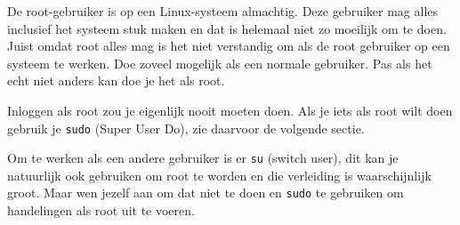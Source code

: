 De root-gebruiker is op een Linux-systeem almachtig. Deze gebruiker mag alles inclusief het systeem stuk maken en dat is helemaal niet zo moeilijk om te doen. Juist omdat root alles mag is het niet verstandig om als de root gebruiker op een systeem te werken. Doe zoveel mogelijk als een normale gebruiker. Pas als het echt niet anders kan doe je het als root.

Inloggen als root zou je eigenlijk nooit moeten doen. Als je iets als root wilt doen gebruik je \texttt{sudo} (Super User Do), zie daarvoor de volgende sectie.

Om te werken als een andere gebruiker is er \texttt{su} (switch user), dit kan je natuurlijk ook gebruiken om root te worden en die verleiding is waarschijnlijk groot. Maar wen jezelf aan om dat niet te doen en \texttt{sudo} te gebruiken om handelingen als root uit te voeren.

